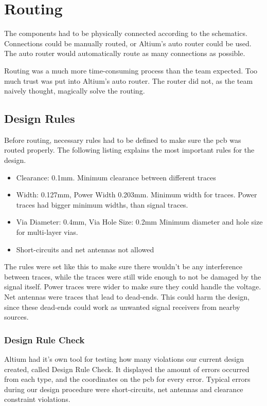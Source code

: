 \section{Routing}
The components had to be physically connected according to the schematics.
Connections could be manually routed, or Altium's auto router could be used. 
The auto router would automatically route as many connections as possible.  

Routing was a much more time-consuming process than the team expected. 
Too much trust was put into Altium's auto router. 
The router did not, as the team naively thought, magically solve the routing. 

\subsection{Design Rules}
Before routing, necessary rules had to be defined to make sure the \gls{pcb} was routed properly. 
The following listing explains the most important rules for the design.
\begin{itemize}
\item Clearance: 0.1mm. 
\newline
Minimum clearance between different traces
\item Width: 0.127mm, Power Width 0.203mm.
\newline
Minimum width for traces. 
Power traces had bigger minimum widths, than signal traces.
\item Via Diameter: 0.4mm, Via Hole Size: 0.2mm
\newline
Minimum diameter and hole size for multi-layer vias.
\item Short-circuits and net antennas not allowed
\end{itemize}

The rules were set like this to make sure there wouldn't be any interference between traces, while the traces were still wide enough to not be damaged by the signal itself. 
Power traces were wider to make sure they could handle the voltage.
Net antennas were traces that lead to dead-ends. 
This could harm the design, since these dead-ends could work as unwanted signal receivers from nearby sources.

\subsubsection{Design Rule Check}
Altium had it's own tool for testing how many violations our current design created, called Design Rule Check. 
It displayed the amount of errors occurred from each type, and the coordinates on the \gls{pcb} for every error. 
Typical errors during our design procedure were short-circuits, net antennas and clearance constraint violations.

